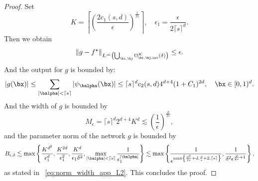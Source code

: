 \documentclass[11pt]{article}
\begin{document}
\begin{proof}
     Set 
     \begin{equation*}
         K = \left\lceil \left( \frac{2 c_1(s,d)}{\epsilon}\right)^{\frac{1}{2s}} \right\rceil, \quad \epsilon_1 = \frac{\epsilon}{2 \lceil s \rceil^d}.
    \end{equation*}
    Then we obtain
    \begin{equation*}
        \left\| g - f^{\star} \right\|_{L^\infty\left(\bigcup_{\bi,\bj} \Omega^K_{\bi, \bj, \mathrm{int}}(\delta)\right)} \leq \epsilon.
    \end{equation*} 
    And the output for $g$ is bounded by:
    \begin{equation*}
        |g(\bx)| \leq \sum_{|\balpha|< \lceil s\rceil} |\psi_{\balpha}(\bx)| \leq \lceil s \rceil^d c_2(s,d) 4^{d+4}(1 + C_1)^{2d}, \quad \bx \in [0,1)^d.
    \end{equation*}
    And the width of $g$ is bounded by 
    \begin{equation*}
        M_\epsilon = \lceil s\rceil^d 2^{d+4} K^{d} \lesssim \left( \frac{1}{\epsilon} \right)^{\frac{d}{2s}}, 
    \end{equation*}
    and the parameter norm of the network $g$ is bounded by 
    \begin{equation*}
        B_{\epsilon, \delta} \lesssim \max \left\{ \frac{K^{d^2}}{\epsilon_1^d}, \frac{K^{2d}}{\epsilon_1^2}, \frac{K^d}{\epsilon_1 \delta^2}, \max_{|\balpha | < \lceil s\rceil} \frac{1}{\epsilon_1^{|\balpha|}}\right\} \lesssim \max \left\{ \frac{1}{\epsilon^{\max \left\{ \frac{d^2}{2s}+d, \frac{d}{s}+2, \lceil s\rceil \right\} }} ,\frac{1}{\delta^2 \epsilon^{\frac{d}{2s}+1}}\right\},
    \end{equation*}
    as stated in ~\eqref{eq:norm_width_app_L2}. This concludes the proof.
\end{proof}
\end{document}
